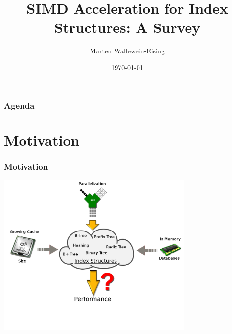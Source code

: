\documentclass{beamer}
\title{SIMD Acceleration for Index Structures: A Survey}
\author{Marten Wallewein-Eising}
\date{\today}
\institute{Otto von Guericke University, Magdeburg}
\begin{document}
\begin{frame}[plain]
 \titlepage
\end{frame}

\section[Agenda]{}
\begin{frame}
\frametitle{Agenda}
\tableofcontents
\end{frame}

\section{Motivation}
\begin{frame}
\frametitle{Motivation}
	\begin{center}
		\includegraphics[width=0.73\textwidth]{img/big_picture.png}
	\end{center}
\end{frame}
\end{document}
